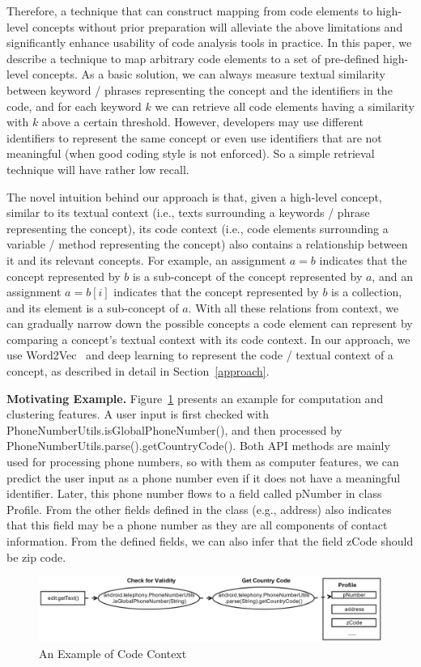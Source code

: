 Therefore, a technique that can construct mapping from code elements to high-level concepts without prior preparation will alleviate the above limitations and significantly enhance usability of code analysis tools in practice. In this paper, we describe a technique to map arbitrary code elements to a set of pre-defined high-level concepts. As a basic solution, we can always measure textual similarity between keyword / phrases representing the concept and the identifiers in the code, and for each keyword $k$ we can retrieve all code elements having a similarity with $k$ above a certain threshold. However, developers may use different identifiers to represent the same concept or even use identifiers that are not meaningful (when good coding style is not enforced). So a simple retrieval technique will have rather low recall.

The novel intuition behind our approach is that, given a high-level concept, similar to its textual context (i.e., texts surrounding a keywords / phrase representing the concept), its code context (i.e., code elements surrounding a variable / method representing the concept) also contains a relationship between it and its relevant concepts. For example, an assignment $a = b$ indicates that the concept represented by $b$ is a sub-concept of the concept represented by $a$, and an assignment $a = b[i]$ indicates that the concept represented by $b$ is a collection, and its element is a sub-concept of $a$. With all these relations from context, we can gradually narrow down the possible concepts a code element can represent by comparing a concept's textual context with its code context. In our approach, we use Word2Vec~\cite{mikolov2013efficient} and deep learning to represent the code / textual context of a concept, as described in detail in Section~\ref{approach}.

\textbf{Motivating Example.} Figure~\ref{example} presents an example for computation and clustering features. A user input is first checked with PhoneNumberUtils.isGlobalPhoneNumber(), and then processed by PhoneNumberUtils.parse().getCountryCode(). Both API methods are mainly used for processing phone numbers, so with them as computer features, we can predict the user input as a phone number even if it does not have a meaningful identifier. Later, this phone number flows to a field called pNumber in class Profile. From the other fields defined in the class (e.g., address) also indicates that this field may be a phone number as they are all components of contact information. From the defined fields, we can also infer that the field zCode should be zip code.

\begin{figure}
	\centering
	\includegraphics[width=\textwidth]{figures/example_computationOld.png}
	\caption{An Example of Code Context}
	\label{example}
\end{figure}

